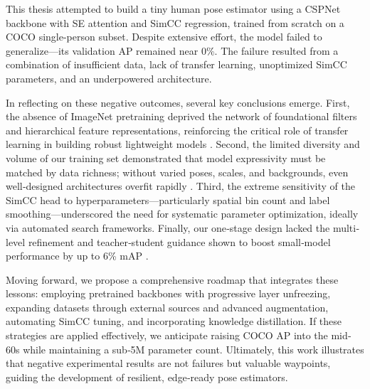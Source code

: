 This thesis attempted to build a tiny human pose estimator using a CSPNet backbone with SE attention and SimCC regression, trained from scratch on a COCO single-person subset. Despite extensive effort, the model failed to generalize—its validation AP remained near 0\%. The failure resulted from a combination of insufficient data, lack of transfer learning, unoptimized SimCC parameters, and an underpowered architecture.

In reflecting on these negative outcomes, several key conclusions emerge. First, the absence of ImageNet pretraining deprived the network of foundational filters and hierarchical feature representations, reinforcing the critical role of transfer learning in building robust lightweight models \cite{Mathis2021Pretraining}. Second, the limited diversity and volume of our training set demonstrated that model expressivity must be matched by data richness; without varied poses, scales, and backgrounds, even well‐designed architectures overfit rapidly \cite{Dubey2023PoseSurvey}. Third, the extreme sensitivity of the SimCC head to hyperparameters—particularly spatial bin count and label smoothing—underscored the need for systematic parameter optimization, ideally via automated search frameworks. Finally, our one‐stage design lacked the multi‐level refinement and teacher‐student guidance shown to boost small‐model performance by up to 6\% mAP \cite{Li2021OKD}.

Moving forward, we propose a comprehensive roadmap that integrates these lessons: employing pretrained backbones with progressive layer unfreezing, expanding datasets through external sources and advanced augmentation, automating SimCC tuning, and incorporating knowledge distillation. If these strategies are applied effectively, we anticipate raising COCO AP into the mid‐60s while maintaining a sub‐5M parameter count. Ultimately, this work illustrates that negative experimental results are not failures but valuable waypoints, guiding the development of resilient, edge‐ready pose estimators.
